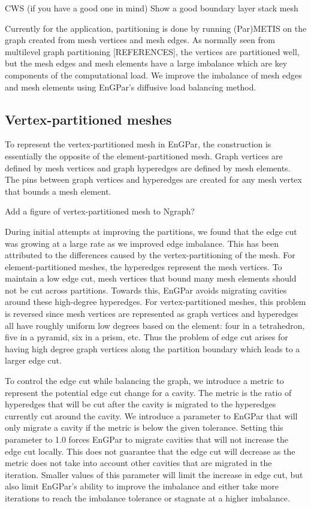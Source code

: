 \documentclass[conference]{IEEEtran}
\begin{document}
{\color{red} CWS (if you have a good one in mind) Show a good boundary layer stack mesh}

Currently for the application, partitioning is done by running (Par)METIS on the graph created
from mesh vertices and mesh edges. As normally seen from multilevel graph
partitioning [REFERENCES],
the vertices are partitioned well, but the mesh edges and mesh elements have a large
imbalance which are key components of the computational load. We improve the imbalance of
mesh edges and mesh elements using EnGPar's diffusive load balancing method.

\subsection{Vertex-partitioned meshes}

To represent the vertex-partitioned mesh in EnGPar, the construction
is essentially the opposite of the element-partitioned mesh. Graph
vertices are defined by mesh vertices and graph hyperedges are defined
by mesh elements. The pins between graph vertices and hyperedges are
created for any mesh vertex that bounds a mesh element.

{\color{red} Add a figure of vertex-partitioned mesh to Ngraph?}

During initial attempts at improving the partitions, we found that the edge cut was growing
at a large rate as we improved edge imbalance. This has been attributed to the differences
caused by the vertex-partitioning of the mesh. For element-partitioned meshes, the hyperedges
represent the mesh vertices. To maintain a low edge cut, mesh vertices that bound many mesh
elements should not be cut across partitions. Towards this, EnGPar avoids migrating cavities
around these high-degree hyperedges. For vertex-partitioned meshes, this problem is reversed
since mesh vertices are represented as graph vertices and hyperedges all have roughly uniform
low degrees based on the element: four in a tetrahedron, five in a pyramid, six in a prism, etc.
Thus the problem of edge cut arises for having high degree graph vertices along the partition
boundary which leads to a larger edge cut.

To control the edge cut while balancing the graph, we introduce a metric to represent the
potential edge cut change for a cavity. The metric is the ratio of hyperedges that will be cut
after the cavity is migrated to the hyperedges currently cut around the cavity. We introduce a
parameter to EnGPar that will only migrate a cavity if the metric is below the given tolerance.
Setting this parameter to 1.0 forces EnGPar to migrate cavities that will not increase the edge
cut locally. This does not guarantee that the edge cut will decrease as the metric does not take
into account other cavities that are migrated in the iteration. Smaller values of this
parameter will limit the increase in edge cut, but also limit EnGPar's ability to improve the
imbalance and either take more iterations to reach the imbalance tolerance or stagnate at a
higher imbalance.
\end{document}
